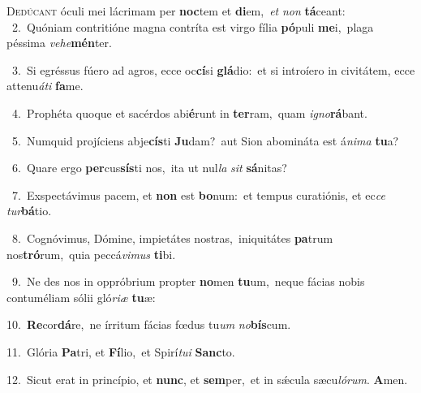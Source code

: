 \lettrine{\initial\textcolor{\initialcolor}{D}}{edúcant} óculi mei lácrimam per \textbf{noc}\-tem et \textbf{di}\-em,~\star \textit{et} \textit{non} \textbf{tá}\-ceant:\\
{\numbfont\textcolor{\numbcolor}{~2.}}~Quóniam contritióne magna contríta est virgo fília \textbf{pó}\-puli \textbf{me}\-i,~\star plaga péssima \textit{ve}\-\textit{he}\textbf{mén}ter.\par
{\numbfont\textcolor{\numbcolor}{~3.}}~Si egréssus fúero ad agros, ecce oc\-\textbf{cí}\-si \textbf{glá}\-dio:~\star et si introíero in civitátem, ecce attenu\-\textit{á}\-\textit{ti} \textbf{fa}\-me.\par
{\numbfont\textcolor{\numbcolor}{~4.}}~Prophéta quoque et sacérdos abi\-\textbf{é}\-runt in \textbf{ter}\-ram,~\star quam \textit{i}\-\textit{gno}\textbf{rá}bant.\par
{\numbfont\textcolor{\numbcolor}{~5.}}~Numquid projíciens abje\-\textbf{cís}\-ti \textbf{Ju}\-dam?~\star aut Sion abomináta est á\-\textit{ni}\-\textit{ma} \textbf{tu}\-a?\par
{\numbfont\textcolor{\numbcolor}{~6.}}~Quare ergo \textbf{per}\-cus\-\textbf{sís}\-ti nos,~\star ita ut nul\textit{la} \textit{sit} \textbf{sá}\-nitas?\par
{\numbfont\textcolor{\numbcolor}{~7.}}~Exspectávimus pacem, et \textbf{non} est \textbf{bo}\-num:~\star et tempus curatiónis, et ec\textit{ce} \textit{tur}\-\textbf{bá}tio.\par
{\numbfont\textcolor{\numbcolor}{~8.}}~Cognóvimus, Dómine, impietátes nostras,~\dagger iniquitátes \textbf{pa}\-trum nos\-\textbf{tró}\-rum,~\star quia peccá\-\textit{vi}\-\textit{mus} \textbf{ti}\-bi.\par
{\numbfont\textcolor{\numbcolor}{~9.}}~Ne des nos in oppróbrium propter \textbf{no}\-men \textbf{tu}\-um,~\star neque fácias nobis contuméliam sólii gló\-\textit{ri}\-\textit{æ} \textbf{tu}\-æ:\par
{\numbfont\textcolor{\numbcolor}{10.}}~\-\textbf{Re}\-cor\-\textbf{dá}\-re,~\star ne írritum fácias fœdus tu\textit{um} \textit{no}\-\textbf{bís}cum.\par
{\numbfont\textcolor{\numbcolor}{11.}}~Glória \textbf{Pa}\-tri, et \textbf{Fí}\-lio,~\star et Spirí\-\textit{tu}\-\textit{i} \textbf{Sanc}\-to.\par
{\numbfont\textcolor{\numbcolor}{12.}}~Sicut erat in princípio, et \textbf{nunc}\-, et \textbf{sem}\-per,~\star et in sǽcula sæcu\-\textit{ló}\-\textit{rum}. \textbf{A}\-men.\par
